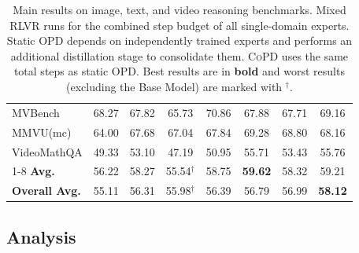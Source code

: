 \documentclass{llmxive}
\providecommand{\method}{\textsc{CoPD}\xspace}
\begin{document}
\begin{table}[t]
\begin{tabular}{l cccc c c c}
\quad MVBench           & 68.27  & 67.82  & 65.73  & 70.86  & 67.88  & 67.71  & 69.16 \\
\quad MMVU(mc)          & 64.00  & 67.68  & 67.04  & 67.84  & 69.28  & 68.80  & 68.16 \\
\quad VideoMathQA       & 49.33  & 53.10  & 47.19  & 50.95  & 55.71  & 53.43  & 55.76 \\
\cmidrule(lr){1-8}
\rowcolor{blue!5} \quad \textbf{Avg.} & 56.22  & 58.27  & 55.54$^\dagger$  & 58.75  & \textbf{59.62}  & 58.32  & 59.21 \\
\midrule
\rowcolor{blue!5} \textbf{Overall Avg.} & 55.11  & 56.31  & 55.98$^\dagger$  & 56.39  & 56.79  & 56.99  & \textbf{58.12} \\
\bottomrule
\end{tabular}
\caption{Main results on image, text, and video reasoning benchmarks. Mixed RLVR runs for the combined step budget of all single-domain experts. Static OPD depends on independently trained experts and performs an additional distillation stage to consolidate them. \method uses the same total steps as static OPD. Best results are in \textbf{bold} and worst results (excluding the Base Model) are marked with $^\dagger$.}
\label{tab:three_branch_results}
\end{table}
\subsection{Analysis}
\label{sec:analysis_exps}
\end{document}
